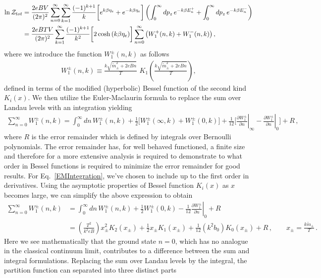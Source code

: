 \documentclass[Universe,article,submit,moreauthors,pdftex]{Definitions/mdpi}
\newcommand*{\req}[1]{Eq.~{\eqref{#1}}}
\begin{document}
\begin{align}
  \label{PartTotal}\ln\mathcal{Z}_{tot}
  &=\frac{2eBV}{(2\pi)^2}\sum_{n=0}^\infty\sum^{\infty}_{k=1}\frac{(-1)^{k+1}}{k}\bigg[e^{k\beta\eta_{e}}+e^{-k\beta\eta_{e}}\bigg]\left(\int_0^\infty dp_z\,e^{-k\beta E_n^+}+\int_0^\infty dp_z\,e^{-k\beta E_n^-}\right)\notag\\
  &=\frac{2eBTV}{(2\pi)^2}\sum^{\infty}_{k=1}\frac{(-1)^{k+1}}{k^2}\bigg[2\cosh{(k\beta\eta_{e})}\bigg]\sum_{n=0}^\infty \left(W^+_1(n,k)+ W^-_1(n,k)\right),
\end{align}
where we introduce the function $W^\pm_1(n,k)$ as follows
\begin{align}
W^\pm_1(n,k)\equiv\frac{k\sqrt{\tilde{m}^2_\pm+2eBn}}{T}\,\,K_1\!\!\left(\frac{k\sqrt{\tilde{m}^2_\pm+2eBn}}{T}\right),
\end{align}
defined in terms of the modified (hyperbolic) Bessel function of the second kind $K_{i}(x)$. We then utilize the Euler-Maclaurin formula to replace the sum over Landau levels with an integration yielding
\begin{align}
  \label{EMIntegration}\sum^{\infty}_{n=0}W^\pm_1(n,k)=\int^\infty_0\!\!dn\,W^\pm_1(n,k)+\frac{1}{2}\bigg[W^\pm_1(\infty,k)+W^\pm_1(0,k)\bigg]+\frac{1}{12}\bigg[\left.\frac{\partial W^\pm_1}{\partial n}\right|_{\infty}-\left.\frac{\partial W^\pm_1}{\partial n}\right|_{0}\bigg]+R\,,
\end{align}
where $R$ is the error remainder which is defined by integrals over Bernoulli polynomials. The error remainder has, for well behaved functioned, a finite size and therefore for a more extensive analysis is required to demonstrate to what order in Bessel functions is required to minimize the error remainder for good results. For \req{EMIntegration}, we've chosen to include up to the first order in derivatives. Using the asymptotic properties of Bessel function $K_{i}(x)$ as $x$ becomes large, we can simplify the above expression to obtain
\begin{align}
  \label{Winitial}\sum^{\infty}_{n=0}W^\pm_1(n,k)&=\int^\infty_0\!\!dn\,W^\pm_1(n,k)+\frac{1}{2}W^\pm_1(0,k)-\frac{1}{12}\left.\frac{\partial W^\pm_1}{\partial n}\right|_{0}+R\\
  \label{WReplacement}
  &=\left(\frac{T^2}{k^2eB}\right)x_{\pm}^{2}K_{2}(x_{\pm})+\frac{1}{2}x_{\pm}K_{1}(x_{\pm})+\frac{1}{12}\left(k^2b_0\right)K_{0}(x_{\pm})+R\,,\qquad x_{\pm} = \frac{k\tilde{m}_{\pm}}{T}\,.
\end{align}
Here we see mathematically that the ground state $n=0$, which has no analogue in the classical continuum limit, contributes to a difference between the sum and integral formulations. Replacing the sum over Landau levels by the integral, the partition function can separated into three distinct parts
\end{document}
